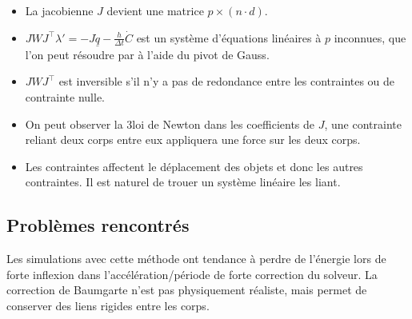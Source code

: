 \begin{itemize}
    \item La jacobienne $J$ devient une matrice $p  \times (n \cdot d)$.
    \item $J W J^\intercal \lambda' = -J\underline{\dot{q}} - \frac{h}{\Delta t} \dot{C}$ est un système d'équations linéaires à $p$ inconnues,
    que l'on peut résoudre par à l'aide du pivot de Gauss.
    \item $J W J^\intercal$ est inversible s'il n'y a pas de redondance entre les contraintes ou de contrainte nulle.
    \item On peut observer la 3\ieme loi de Newton dans les coefficients de $J$, une contrainte reliant deux corps entre eux appliquera une force sur les deux corps.
    \item Les contraintes affectent le déplacement des objets et donc les autres contraintes.
    Il est naturel de trouer un système linéaire les liant.
\end{itemize}

\subsection{Problèmes rencontrés}\label{subsec:problemes-rencontres}
Les simulations avec cette méthode ont tendance à perdre de l'énergie lors de forte inflexion dans l'accélération/période de forte correction du solveur.
La correction de Baumgarte n'est pas physiquement réaliste, mais permet de conserver des liens rigides entre les corps.